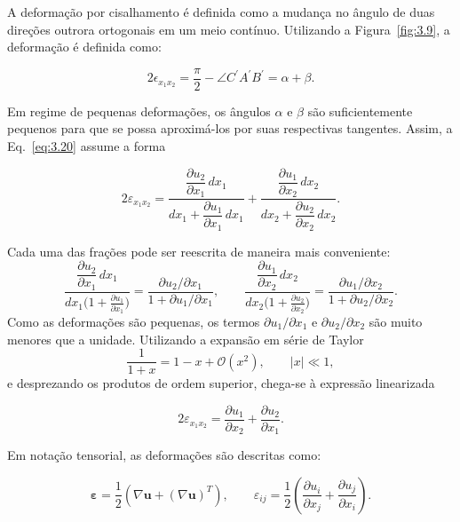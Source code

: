 \indent A deformação por cisalhamento é definida como a mudança no ângulo de duas direções outrora ortogonais em um meio contínuo. Utilizando a Figura~\ref{fig:3.9}, a deformação é definida como: 

\begin{equation}
    2\epsilon_{x_1x_2} = \frac{\pi}{2} - \angle C^{\prime}A^{\prime}B^{\prime} = \alpha + \beta.
    \label{eq:3.20}
\end{equation}

\indent Em regime de pequenas deformações, os ângulos $\alpha$ e $\beta$ são suficientemente pequenos para que se possa aproximá-los por suas respectivas tangentes. Assim, a Eq.~\ref{eq:3.20} assume a forma

\begin{equation}
    2\varepsilon_{x_1x_2} = \frac{\dfrac{\partial u_2}{\partial x_1}\,dx_1}{dx_1 + \dfrac{\partial u_1}{\partial x_1}\,dx_1} + \frac{\dfrac{\partial u_1}{\partial x_2}\,dx_2}{dx_2 + \dfrac{\partial u_2}{\partial x_2}\,dx_2}.
    \label{eq:3.20b}
\end{equation}

\noindent Cada uma das frações pode ser reescrita de maneira mais conveniente:
\begin{equation*}
    \frac{\dfrac{\partial u_2}{\partial x_1}\,dx_1}{dx_1\bigl(1 + \tfrac{\partial u_1}{\partial x_1}\bigr)}
    = \frac{\partial u_2/\partial x_1}{1 + \partial u_1/\partial x_1},
    \qquad
    \frac{\dfrac{\partial u_1}{\partial x_2}\,dx_2}{dx_2\bigl(1 + \tfrac{\partial u_2}{\partial x_2}\bigr)}
    = \frac{\partial u_1/\partial x_2}{1 + \partial u_2/\partial x_2}.
\end{equation*}
Como as deformações são pequenas, os termos $\partial u_1/\partial x_1$ e $\partial u_2/\partial x_2$ são muito menores que a unidade. Utilizando a expansão em série de Taylor
$$\frac{1}{1+x} = 1 - x + \mathcal{O}(x^2), \qquad |x|\ll 1,$$ e desprezando os produtos de ordem superior, chega-se à expressão linearizada

\begin{equation}
    2\varepsilon_{x_1x_2} = \frac{\partial u_1}{\partial x_2} + \frac{\partial u_2}{\partial x_1}.
    \label{eq:3.21}
\end{equation}

\indent Em notação tensorial, as deformações são descritas como: 

\begin{equation}
    \boldsymbol{\varepsilon} = \frac{1}{2} \left( \nabla \mathbf{u} + (\nabla \mathbf{u})^T \right), \qquad \varepsilon_{ij} = \frac{1}{2} \left( \frac{\partial u_i}{\partial x_j} +  \frac{\partial u_j}{\partial x_i} \right).
    \label{eq:3.22}
\end{equation}

